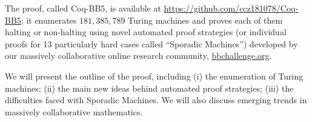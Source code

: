 \documentclass[11pt]{article}
\newcommand{\BBtheFifthTNF}{181{,}385{,}789}
\newcommand{\CoqBB}{Coq-BB5\xspace}
\theoremstyle{definition} %
\numberwithin{equation}{section}
\theoremstyle{definition} %
\begin{document}






The proof, called \CoqBB, is available at \url{https://github.com/ccz181078/Coq-BB5}; it enumerates $\BBtheFifthTNF$ Turing machines and proves each of them halting or non-halting using novel automated proof strategies (or individual proofs for 13 particularly hard cases called ``Sporadic Machines'') developed by our massively collaborative online research community, \url{bbchallenge.org}. 

We will present the outline of the proof, including (i) the enumeration of Turing machines; (ii) the main new ideas behind automated proof strategies; (iii) the difficulties faced with Sporadic Machines. We will also discuss emerging trends in massively collaborative mathematics.

\vspace{-3em}

\end{document}

